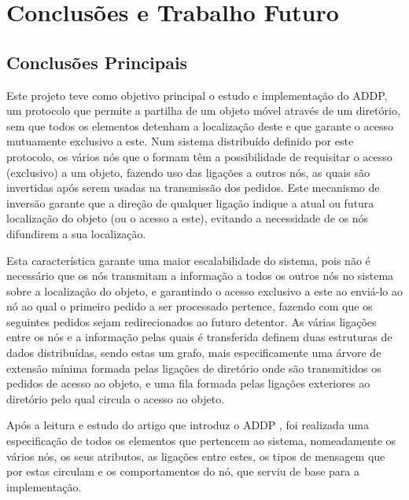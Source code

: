 \chapter{Conclusões e Trabalho Futuro}
\label{chap:conc-trab-futuro}

\section{Conclusões Principais}
\label{sec:conc-princ}

Este projeto teve como objetivo principal o estudo e implementação do \acs{ADDP}, um protocolo que permite a partilha de um objeto móvel através de um diretório, 
sem que todos os elementos detenham a localização deste
e que garante o acesso mutuamente exclusivo a este. 
Num sistema distribuído definido por este protocolo, os vários nós que o formam têm a possibilidade de requisitar o acesso (exclusivo) a um objeto,
fazendo uso das ligações a outros nós, as quais são invertidas após serem usadas na transmissão dos pedidos. Este mecanismo de inversão garante que a direção de qualquer
ligação indique a atual ou futura localização do objeto (ou o acesso a este), evitando a necessidade de os nós difundirem a sua localização.

Esta característica garante uma maior escalabilidade do sistema, pois não é necessário que os nós transmitam a informação a todos os outros nós no sistema sobre a localização
do objeto, e garantindo o acesso exclusivo a este ao enviá-lo ao nó ao qual o primeiro pedido a ser processado pertence, fazendo com que os seguintes pedidos sejam redirecionados
ao futuro detentor.
As várias ligações entre os nós e a informação pelas quais é transferida definem duas estruturas de dados distribuídas, sendo estas um grafo, mais especificamente uma árvore de extensão mínima
formada pelas ligações de diretório onde são transmitidos os pedidos de acesso ao objeto, e uma fila formada pelas ligações exteriores ao diretório pelo qual circula o acesso ao objeto.

Após a leitura e estudo do artigo que introduz o \acs{ADDP} \cite{Arrow}, foi realizada uma especificação de todos os elementos que pertencem ao sistema, nomeadamente os vários nós, os seus atributos,
as ligações entre estes, os tipos de mensagem que por estas circulam e os comportamentos do nó, que serviu de base para a implementação. 

